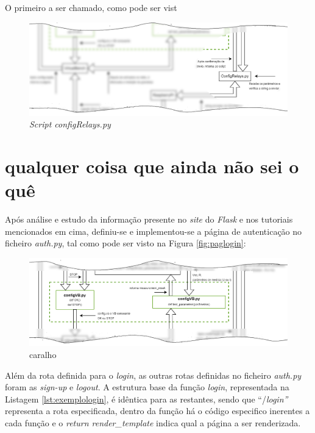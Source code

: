 O primeiro a ser chamado, como pode ser vist
\begin{figure}[hbtp]
	\centering
	\includegraphics[width=1\textwidth]{figures/ohm_diagramaCUTRelay.drawio.png}
	\caption{\textit{Script configRelays.py}}
	\label{fig:cutconfigRelays}
\end{figure}

\section{qualquer coisa que ainda não sei o quê}

Após análise e estudo da informação presente no \textit{site} do \textit{Flask} e nos tutoriais mencionados em cima, definiu-se e implementou-se a página de autenticação no ficheiro \textit{auth.py}, tal como pode ser visto na Figura \ref{fig:paglogin}:

\begin{figure}[hbtp]
	\centering
	\includegraphics[width=1\textwidth]{figures/ohm_diagramaCUT.drawio.png}
	\caption{caralho}
	\label{fig:diagramaCUT}
\end{figure}

Além da rota definida para o \textit{login}, as outras rotas definidas no ficheiro \textit{auth.py} foram as \textit{sign-up} e \textit{logout}. A estrutura base da função \textit{login}, representada na Listagem \ref{lst:exemplologin}, é idêntica para as restantes, sendo que ``/\textit{login''} representa a rota especificada, dentro da função há o código especifico inerentes a cada função e o \textit{return render\_template} indica qual a página a ser renderizada.

